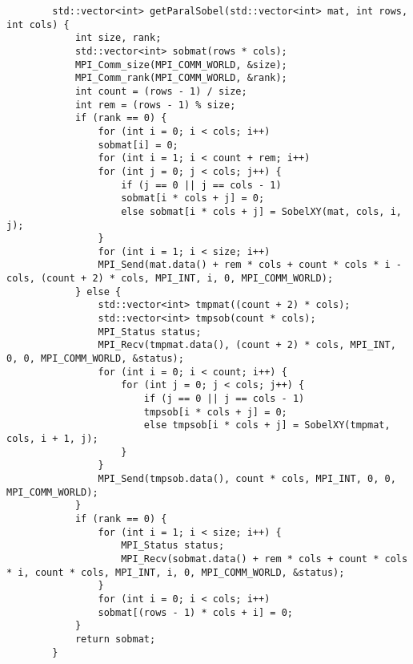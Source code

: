 \documentclass{report}
\begin{document}
\begin{lstlisting}
		std::vector<int> getParalSobel(std::vector<int> mat, int rows, int cols) {
			int size, rank;
			std::vector<int> sobmat(rows * cols);
			MPI_Comm_size(MPI_COMM_WORLD, &size);
			MPI_Comm_rank(MPI_COMM_WORLD, &rank);
			int count = (rows - 1) / size;
			int rem = (rows - 1) % size;
			if (rank == 0) {
				for (int i = 0; i < cols; i++)
				sobmat[i] = 0;
				for (int i = 1; i < count + rem; i++)
				for (int j = 0; j < cols; j++) {
					if (j == 0 || j == cols - 1)
					sobmat[i * cols + j] = 0;
					else sobmat[i * cols + j] = SobelXY(mat, cols, i, j);
				}
				for (int i = 1; i < size; i++)
				MPI_Send(mat.data() + rem * cols + count * cols * i - cols, (count + 2) * cols, MPI_INT, i, 0, MPI_COMM_WORLD);
			} else {
				std::vector<int> tmpmat((count + 2) * cols);
				std::vector<int> tmpsob(count * cols);
				MPI_Status status;
				MPI_Recv(tmpmat.data(), (count + 2) * cols, MPI_INT, 0, 0, MPI_COMM_WORLD, &status);
				for (int i = 0; i < count; i++) {
					for (int j = 0; j < cols; j++) {
						if (j == 0 || j == cols - 1)
						tmpsob[i * cols + j] = 0;
						else tmpsob[i * cols + j] = SobelXY(tmpmat, cols, i + 1, j);
					}
				}
				MPI_Send(tmpsob.data(), count * cols, MPI_INT, 0, 0, MPI_COMM_WORLD);
			}
			if (rank == 0) {
				for (int i = 1; i < size; i++) {
					MPI_Status status;
					MPI_Recv(sobmat.data() + rem * cols + count * cols * i, count * cols, MPI_INT, i, 0, MPI_COMM_WORLD, &status);
				}
				for (int i = 0; i < cols; i++)
				sobmat[(rows - 1) * cols + i] = 0;
			}
			return sobmat;
		}
	\end{lstlisting}
\end{document}

